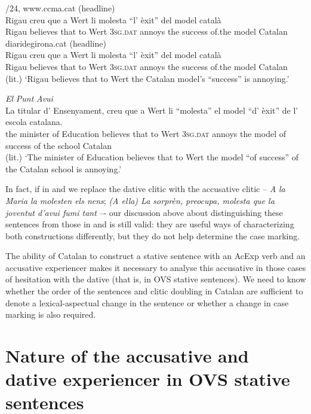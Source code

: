 \documentclass[output=paper,colorlinks,citecolor=brown,modfonts,nonflat]{langsci/langscibook}
\begin{document}
\ea%
 \label{ex:royo:7}
 /24, www.ccma.cat (headline)\\
 \gll Rigau creu que a Wert li molesta “l' èxit” del model català\\
  Rigau believes that to Wert \textsc{3sg.dat} annoys the success of.the model Catalan\\
 
 \ex diaridegirona.cat (headline)\\
 \gll Rigau creu que a Wert li molesta “l’ èxit” del model català\\
Rigau believes that to Wert \textsc{3sg.dat} annoys   the success of.the model Catalan \\
 \glt (lit.) ‘Rigau believes that to Wert the Catalan model’s “success” is annoying.’
 
 \ex \emph{El} \emph{Punt} \emph{Avui}\\
 \gll La titular d’ Ensenyament, creu que a Wert li “molesta” el model “d’ èxit” de l’ escola catalana.\\
 the minister of Education believes that to Wert \textsc{3sg.dat} annoys the model of success of the school Catalan\\
 \glt (lit.) ‘The minister of Education believes that to Wert the model “of success” of the Catalan school
is annoying.’ 
 \z
 \z


In fact, if in  and  we replace the dative clitic with the accusative clitic – \textit{A la Maria la molesten els nens}; \textit{(A ella) La sorprèn, preocupa, molesta que la joventut d’avui fumi tant} –- our discussion above about distinguishing these sentences from those in  and  is still valid: they are useful ways of characterizing both constructions differently, but they do not help determine the case marking.

The ability of Catalan to construct a stative sentence with an AcExp verb and an accusative experiencer makes it necessary to analyse this accusative in those cases of hesitation with the dative (that is, in OVS stative sentences). We need to know whether the order of the sentences and clitic doubling in Catalan are sufficient to denote a lexical-aspectual change in the sentence or whether a change in case marking is also required.


\section{Nature of the accusative and dative experiencer in OVS stative sentences}\label{sec:royo:3}
\end{document}
